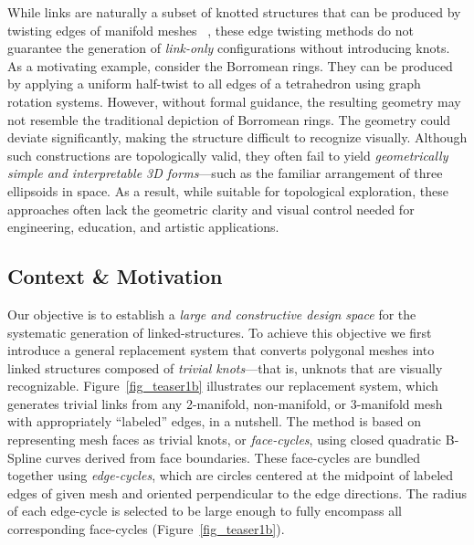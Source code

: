 \documentclass[times,twocolumn,final]{elsarticle}
\newcommand{\ergun}[1]{{\color{red} #1}}
\begin{document}
While links are naturally a subset of knotted structures \ergun{that can be produced by twisting edges of manifold meshes ~\cite{akleman2020topologically,akleman2015extended}, these edge twisting methods do not guarantee} the generation of \textit{link-only} configurations without introducing knots.
As a motivating example, consider the Borromean rings. They can be produced by applying a uniform half-twist to all edges of a tetrahedron using graph rotation systems. However, without formal guidance, the resulting geometry may not resemble the traditional depiction of Borromean rings. The geometry could deviate significantly, making the structure difficult to recognize visually. Although such constructions are topologically valid, they often fail to yield \textit{geometrically simple and interpretable 3D forms}—such as the familiar arrangement of three ellipsoids in space. As a result, while suitable for topological exploration, these approaches often lack the geometric clarity and visual control needed for engineering, education, and artistic applications.

\subsection{Context \& Motivation}

Our objective is to establish a \textit{large and constructive design space} for the systematic generation of linked-structures.
\ergun{To achieve this objective we first introduce a general replacement system that converts polygonal meshes into linked structures composed of \textit{trivial knots}—that is, unknots that are visually recognizable. Figure~\ref{fig_teaser1b} illustrates our replacement system, which generates trivial links from any 2-manifold, non-manifold, or 3-manifold mesh with appropriately “labeled” edges, in a nutshell.} The method is based on representing mesh faces as trivial knots, or \textit{face-cycles}, using closed quadratic B-Spline curves derived from face boundaries. These face-cycles are bundled together using \textit{edge-cycles}, which are circles centered at the midpoint of labeled edges of given mesh and oriented perpendicular to the edge directions. The radius of each edge-cycle is selected to be large enough to fully encompass all corresponding face-cycles (Figure~\ref{fig_teaser1b}). 
\end{document}

